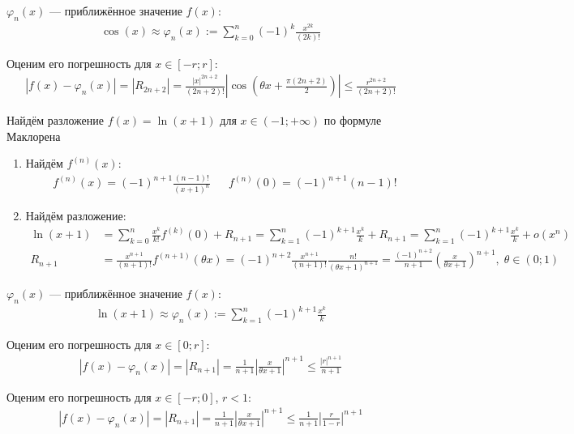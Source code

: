 \documentclass{article}
\begin{document}
$\varphi_{n}(x)$ --- приближённое значение $f(x)$:
\begin{align*}
	\cos(x)\approx\varphi_{n}(x):=\sum_{k=0}^{n}(-1)^{k}\frac{x^{2k}}{(2k)!}
\end{align*}

Оценим его погрешность для $x\in[-r;r]$:
\begin{align*}
	|f(x)-\varphi_{n}(x)|=|R_{2n+2}|=\frac{|x|^{2n+2}}{(2n+2)!}\left|\cos\left(\theta x+\frac{\pi (2n+2)}{2}\right)\right|\leq\frac{r^{2n+2}}{(2n+2)!}
\end{align*}

\pagebreak


Найдём разложение $f(x)=\ln(x+1)$ для $x\in (-1;+\infty)$ по формуле Маклорена

\begin{enumerate}
	\item{}Найдём $f^{(n)}(x)$:
	\begin{align*}
		 & f^{(n)}(x)=(-1)^{n+1}\frac{(n-1)!}{(x+1)^{n}} &  & f^{(n)}(0)=(-1)^{n+1}(n-1)!
	\end{align*}
	\item{}Найдём разложение:
	\begin{align*}
		\ln(x+1) & =\sum_{k=0}^{n}\frac{x^{k}}{k!}f^{(k)}(0)+R_{n+1}=\sum_{k=1}^{n}(-1)^{k+1}\frac{x^{k}}{k}+R_{n+1}
		=\sum_{k=1}^{n}(-1)^{k+1}\frac{x^{k}}{k}+o(x^{n})                                                                   \\
		R_{n+1}  & =\frac{x^{n+1}}{(n+1)!}f^{(n+1)}(\theta x)=(-1)^{n+2}\frac{x^{n+1}}{(n+1)!}\frac{n!}{(\theta x+1)^{n+1}}
		=\frac{(-1)^{n+2}}{n+1}\left(\frac{x}{\theta x+1}\right)^{n+1},\;\theta\in(0;1)
	\end{align*}
\end{enumerate}

$\varphi_{n}(x)$ --- приближённое значение $f(x)$:
\begin{align*}
	\ln(x+1)\approx\varphi_{n}(x):=\sum_{k=1}^{n}(-1)^{k+1}\frac{x^{k}}{k}
\end{align*}

Оценим его погрешность для $x\in[0;r]$:
\begin{align*}
	|f(x)-\varphi_{n}(x)|=|R_{n+1}|=\frac{1}{n+1}\left|\frac{x}{\theta x+1}\right|^{n+1}\leq\frac{|r|^{n+1}}{n+1}
\end{align*}

Оценим его погрешность для $x\in[-r;0]$, $r<1$:
\begin{align*}
	|f(x)-\varphi_{n}(x)|=|R_{n+1}|=\frac{1}{n+1}\left|\frac{x}{\theta x+1}\right|^{n+1}\leq\frac{1}{n+1}\left|\frac{r}{1-r}\right|^{n+1}
\end{align*}
\end{document}
